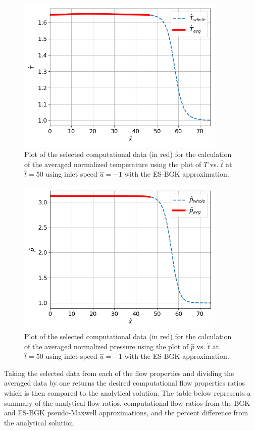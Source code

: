 \documentclass[a4paper]{article}
\begin{document}
\begin{figure}[hbt!]
    \centering
    \includegraphics[width=10cm]{plots/problem_h_ESBGK_T.png}
    \caption{\centering Plot of the selected computational data (in red) for the calculation of the averaged normalized temperature using the plot of $\hat{T}$ vs. $\hat{t}$ at $\hat{t} = 50$ using inlet speed $\hat{u} = -1$ with the ES-BGK approximation.}
    \label{problem_h_ESBGK_T}
\end{figure}
\begin{figure}[hbt!]
    \centering
    \includegraphics[width=10cm]{plots/problem_h_BGK_p.png}
    \caption{\centering Plot of the selected computational data (in red) for the calculation of the averaged normalized pressure using the plot of $\hat{p}$ vs. $\hat{t}$ at $\hat{t} = 50$ using inlet speed $\hat{u} = -1$ with the ES-BGK approximation.}
    \label{problem_h_ESBGK_p}
\end{figure}
\clearpage
Taking the selected data from each of the flow properties and dividing the averaged data by one returns the desired computational flow properties ratios which is then compared to the analytical solution. The table below represents a summary of the analytical flow ratios, computational flow ratios from the BGK and ES-BGK pseudo-Maxwell approximations, and the percent difference from the analytical solution. 
\end{document}
